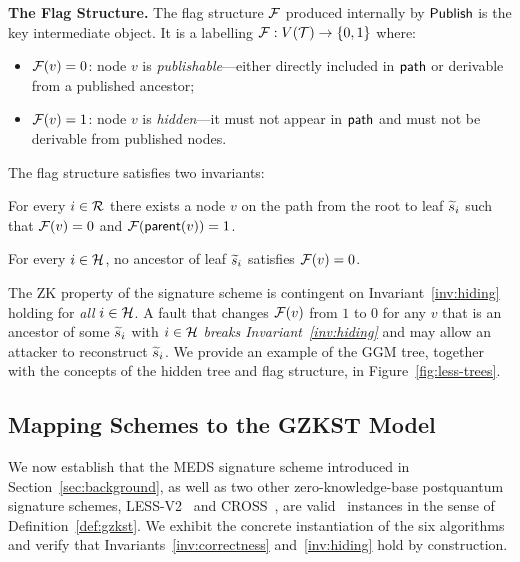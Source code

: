 \textbf{The Flag Structure.}
The flag structure $\mathcal{F}$ produced internally by $\mathsf{Publish}$ is the key
intermediate object.  It is a labelling $\mathcal{F} : V(\mathcal{T}) \to \{0,1\}$ where:
\begin{itemize}
  \item $\mathcal{F}(v) = 0$: node $v$ is \emph{publishable}---either
        directly included in $\mathsf{path}$ or derivable from a published ancestor;
  \item $\mathcal{F}(v) = 1$: node $v$ is \emph{hidden}---it must not appear in $\mathsf{path}$ and must not be derivable from published nodes.
\end{itemize}
The flag structure satisfies two invariants:

\begin{invariant}[Correctness]
\label{inv:correctness}
For every $i \in \mathcal{R}$ there exists a node $v$ on the path from the root to
leaf $\widetilde{s}_i$ such that $\mathcal{F}(v) = 0$ and $\mathcal{F}(\mathsf{parent}(v)) = 1$.
\end{invariant}

\begin{invariant}[ZK hiding]
\label{inv:hiding}
For every $i \in \mathcal{H}$, no ancestor of leaf $\widetilde{s}_i$ satisfies $\mathcal{F}(v) = 0$.
\end{invariant}

The ZK property of the signature scheme is contingent on
Invariant~\ref{inv:hiding} holding for \emph{all} $i \in \mathcal{H}$. A fault that
changes $\mathcal{F}(v)$ from $1$ to $0$ for any $v$ that is an ancestor of some
$\widetilde{s}_i$ with $i \in \mathcal{H}$ \emph{breaks Invariant~\ref{inv:hiding}} and
may allow an attacker to reconstruct $\widetilde{s}_i$. We provide an example of
the GGM tree, together with the concepts of the hidden tree and flag
structure, in Figure~\ref{fig:less-trees}.


\subsection{Mapping Schemes to the GZKST Model}
\label{sec:mapping}

We now establish that the MEDS signature scheme
introduced in Section~\ref{sec:background}, as well as two other zero-knowledge-base 
postquantum signature schemes, LESS-V2~\cite{LESS-spec} and CROSS~\cite{LESS-spec}, are 
valid \GZKST\ instances in the
sense of Definition~\ref{def:gzkst}.  We exhibit the concrete
instantiation of the six algorithms and verify that
Invariants~\ref{inv:correctness} and~\ref{inv:hiding} hold by construction.


